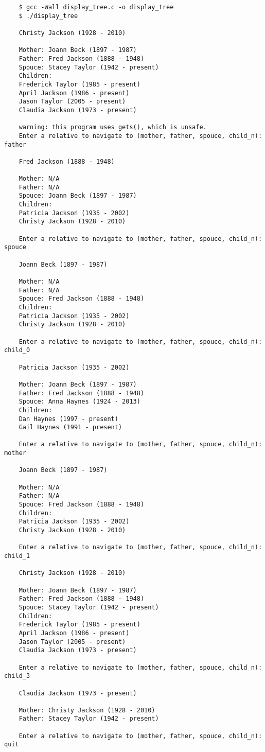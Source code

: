 \documentclass[11pt]{article}
\begin{document}
\begin{verbatim}
    $ gcc -Wall display_tree.c -o display_tree
    $ ./display_tree
    
    Christy Jackson (1928 - 2010)
    
    Mother: Joann Beck (1897 - 1987)
    Father: Fred Jackson (1888 - 1948)
    Spouce: Stacey Taylor (1942 - present)
    Children:
    Frederick Taylor (1985 - present)
    April Jackson (1986 - present)
    Jason Taylor (2005 - present)
    Claudia Jackson (1973 - present)
    
    warning: this program uses gets(), which is unsafe.
    Enter a relative to navigate to (mother, father, spouce, child_n): father
    
    Fred Jackson (1888 - 1948)
    
    Mother: N/A
    Father: N/A
    Spouce: Joann Beck (1897 - 1987)
    Children:
    Patricia Jackson (1935 - 2002)
    Christy Jackson (1928 - 2010)
    
    Enter a relative to navigate to (mother, father, spouce, child_n): spouce
    
    Joann Beck (1897 - 1987)
    
    Mother: N/A
    Father: N/A
    Spouce: Fred Jackson (1888 - 1948)
    Children:
    Patricia Jackson (1935 - 2002)
    Christy Jackson (1928 - 2010)
    
    Enter a relative to navigate to (mother, father, spouce, child_n): child_0
    
    Patricia Jackson (1935 - 2002)
    
    Mother: Joann Beck (1897 - 1987)
    Father: Fred Jackson (1888 - 1948)
    Spouce: Anna Haynes (1924 - 2013)
    Children:
    Dan Haynes (1997 - present)
    Gail Haynes (1991 - present)
    
    Enter a relative to navigate to (mother, father, spouce, child_n): mother
    
    Joann Beck (1897 - 1987)
    
    Mother: N/A
    Father: N/A
    Spouce: Fred Jackson (1888 - 1948)
    Children:
    Patricia Jackson (1935 - 2002)
    Christy Jackson (1928 - 2010)
    
    Enter a relative to navigate to (mother, father, spouce, child_n): child_1
    
    Christy Jackson (1928 - 2010)
    
    Mother: Joann Beck (1897 - 1987)
    Father: Fred Jackson (1888 - 1948)
    Spouce: Stacey Taylor (1942 - present)
    Children:
    Frederick Taylor (1985 - present)
    April Jackson (1986 - present)
    Jason Taylor (2005 - present)
    Claudia Jackson (1973 - present)
    
    Enter a relative to navigate to (mother, father, spouce, child_n): child_3
    
    Claudia Jackson (1973 - present)
    
    Mother: Christy Jackson (1928 - 2010)
    Father: Stacey Taylor (1942 - present)
    
    Enter a relative to navigate to (mother, father, spouce, child_n): quit
\end{verbatim}
\end{document}
